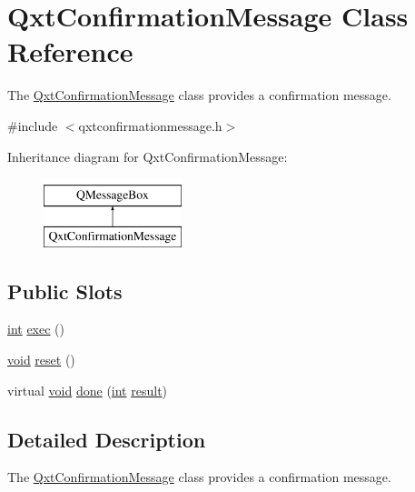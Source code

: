 \hypertarget{class_qxt_confirmation_message}{\section{Qxt\-Confirmation\-Message Class Reference}
\label{class_qxt_confirmation_message}
}


The \hyperlink{class_qxt_confirmation_message}{Qxt\-Confirmation\-Message} class provides a confirmation message.  




{\ttfamily \#include $<$qxtconfirmationmessage.\-h$>$}

Inheritance diagram for Qxt\-Confirmation\-Message\-:\begin{figure}[H]
\begin{center}
\leavevmode
\includegraphics[height=2.000000cm]{class_qxt_confirmation_message}
\end{center}
\end{figure}
\subsection*{Public Slots}
\begin{DoxyCompactItemize}
\item 
\hyperlink{ioapi_8h_a787fa3cf048117ba7123753c1e74fcd6}{int} \hyperlink{class_qxt_confirmation_message_acf11a522244c7ffd61634178a70c56e0}{exec} ()
\item 
\hyperlink{group___u_a_v_objects_plugin_ga444cf2ff3f0ecbe028adce838d373f5c}{void} \hyperlink{class_qxt_confirmation_message_a0e1dc468babf30c170d5771a58b8134e}{reset} ()
\item 
virtual \hyperlink{group___u_a_v_objects_plugin_ga444cf2ff3f0ecbe028adce838d373f5c}{void} \hyperlink{class_qxt_confirmation_message_ae38c6f1c682d49e4405299c5fbd3bdaf}{done} (\hyperlink{ioapi_8h_a787fa3cf048117ba7123753c1e74fcd6}{int} \hyperlink{qxtslotjob_8h_aab161efab0511ea9612b64c40e9852ca}{result})
\end{DoxyCompactItemize}


\subsection{Detailed Description}
The \hyperlink{class_qxt_confirmation_message}{Qxt\-Confirmation\-Message} class provides a confirmation message. 

